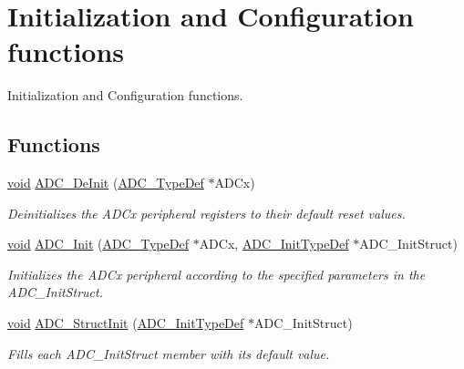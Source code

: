 \hypertarget{group___a_d_c___group1}{\section{Initialization and Configuration functions}
\label{group___a_d_c___group1}
}


Initialization and Configuration functions.  


\subsection*{Functions}
\begin{DoxyCompactItemize}
\item 
\hyperlink{group___n_a_m_e_ga18028b8badbf1ea7e704ccac3c488e82}{void} \hyperlink{group___a_d_c___group1_ga31fa6bc09de17125e9db2830ce77c09b}{A\-D\-C\-\_\-\-De\-Init} (\hyperlink{struct_a_d_c___type_def}{A\-D\-C\-\_\-\-Type\-Def} $\ast$A\-D\-Cx)
\begin{DoxyCompactList}\small\item\em Deinitializes the A\-D\-Cx peripheral registers to their default reset values. \end{DoxyCompactList}\item 
\hyperlink{group___n_a_m_e_ga18028b8badbf1ea7e704ccac3c488e82}{void} \hyperlink{group___a_d_c___group1_gabbab6038cf8691404350625e477254f9}{A\-D\-C\-\_\-\-Init} (\hyperlink{struct_a_d_c___type_def}{A\-D\-C\-\_\-\-Type\-Def} $\ast$A\-D\-Cx, \hyperlink{struct_a_d_c___init_type_def}{A\-D\-C\-\_\-\-Init\-Type\-Def} $\ast$A\-D\-C\-\_\-\-Init\-Struct)
\begin{DoxyCompactList}\small\item\em Initializes the A\-D\-Cx peripheral according to the specified parameters in the A\-D\-C\-\_\-\-Init\-Struct. \end{DoxyCompactList}\item 
\hyperlink{group___n_a_m_e_ga18028b8badbf1ea7e704ccac3c488e82}{void} \hyperlink{group___a_d_c___group1_ga6c6e754d1d0a98d56e465efaf73272ec}{A\-D\-C\-\_\-\-Struct\-Init} (\hyperlink{struct_a_d_c___init_type_def}{A\-D\-C\-\_\-\-Init\-Type\-Def} $\ast$A\-D\-C\-\_\-\-Init\-Struct)
\begin{DoxyCompactList}\small\item\em Fills each A\-D\-C\-\_\-\-Init\-Struct member with its default value. \end{DoxyCompactList}\item 

\end{DoxyCompactItemize}

